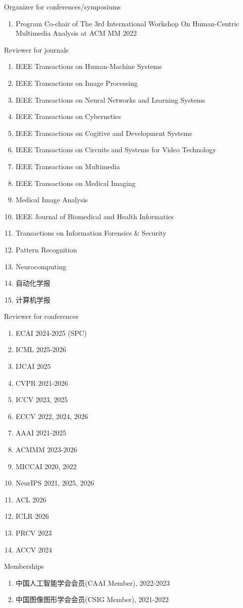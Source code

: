 \documentclass[a4paper,36pt]{article}
\newcommand{\chn}[1]{#1}
\newcommand{\resumeItemWithoutTitle}[1]{
  \item\justifying\small{
    {#1 \vspace{-2pt}}
  }
}
\newcommand{\resumeSubHeadingEnumStart}{\begin{enumerate}[leftmargin=*]}
\newcommand{\resumeSubHeadingEnumEnd}{\end{enumerate}}
\begin{document}
\resumeItemWithoutTitle{Organizer for conferences/symposiums} \vspace{-5pt}
\resumeSubHeadingEnumStart
\resumeItemWithoutTitle{Program Co-chair of The 3rd International Workshop On Human-Centric Multimedia Analysis at ACM MM 2022}
\resumeSubHeadingEnumEnd

\resumeItemWithoutTitle{Reviewer for journals}\vspace{-5pt}
\resumeSubHeadingEnumStart
\resumeItemWithoutTitle{IEEE Transactions on Human-Machine Systems}
\resumeItemWithoutTitle{IEEE Transactions on Image Processing}
\resumeItemWithoutTitle{IEEE Transactions on Neural Networks and Learning Systems}
\resumeItemWithoutTitle{IEEE Transactions on Cybernetics}
\resumeItemWithoutTitle{IEEE Transactions on Cogitive and Development Systems}
\resumeItemWithoutTitle{IEEE Transactions on Circuits and Systems for Video Technology}
\resumeItemWithoutTitle{IEEE Transactions on Multimedia}
\resumeItemWithoutTitle{IEEE Transactions on Medical Imaging}
\resumeItemWithoutTitle{Medical Image Analysis}
\resumeItemWithoutTitle{IEEE Journal of Biomedical and Health Informatics}
\resumeItemWithoutTitle{Transactions on Information Forensics \& Security}
\resumeItemWithoutTitle{Pattern Recognition}
\resumeItemWithoutTitle{Neurocomputing}
\resumeItemWithoutTitle{\chn{自动化学报}}
\resumeItemWithoutTitle{\chn{计算机学报}}
\resumeSubHeadingEnumEnd

\resumeItemWithoutTitle{Reviewer for conferences}\vspace{-5pt}
\resumeSubHeadingEnumStart
\resumeItemWithoutTitle{ECAI 2024-2025 (SPC)}
\resumeItemWithoutTitle{ICML 2025-2026}
\resumeItemWithoutTitle{IJCAI 2025}
\resumeItemWithoutTitle{CVPR 2021-2026}
\resumeItemWithoutTitle{ICCV 2023, 2025}
\resumeItemWithoutTitle{ECCV 2022, 2024, 2026}
\resumeItemWithoutTitle{AAAI 2021-2025}
\resumeItemWithoutTitle{ACMMM 2023-2026}
\resumeItemWithoutTitle{MICCAI 2020, 2022}
\resumeItemWithoutTitle{NeurIPS 2021, 2025, 2026}
\resumeItemWithoutTitle{ACL 2026}
\resumeItemWithoutTitle{ICLR 2026}
\resumeItemWithoutTitle{PRCV 2023}
\resumeItemWithoutTitle{ACCV 2024}
\resumeSubHeadingEnumEnd

\resumeItemWithoutTitle{Memberships}\vspace{-5pt}
\resumeSubHeadingEnumStart
\resumeItemWithoutTitle{\chn{中国人工智能学会会员}(CAAI Member), 2022-2023}
\resumeItemWithoutTitle{\chn{中国图像图形学会会员}(CSIG Member), 2021-2022}
\resumeSubHeadingEnumEnd

\end{document}
